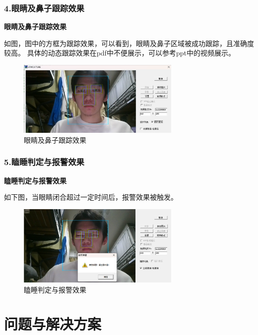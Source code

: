 \documentclass[12pt,hyperref,a4paper,UTF8]{ctexart}
\begin{document}
        \subsubsection*{\large \textbf{4.眼睛及鼻子跟踪效果}}

        \large \textbf{眼睛及鼻子跟踪效果}

        如图，图中的方框为跟踪效果，可以看到，眼睛及鼻子区域被成功跟踪，且准确度较高。
        具体的动态跟踪效果在pdf中不便展示，可以参考ppt中的视频展示。
        \begin{figure}[H]
            \centering
            \includegraphics[width=0.7\textwidth]{./figures/fig/image21.png}
            \caption{眼睛及鼻子跟踪效果}
            \label{fig:example}
        \end{figure}

        \subsubsection*{\large \textbf{5.瞌睡判定与报警效果}}

        \large \textbf{瞌睡判定与报警效果}

        如下图，当眼睛闭合超过一定时间后，报警效果被触发。
        \begin{figure}[H]
            \centering
            \includegraphics[width=0.7\textwidth]{./figures/fig/image22.png}
            \caption{瞌睡判定与报警效果}
            \label{fig:example}
        \end{figure}

\newpage
\section{问题与解决方案}
\end{document}

